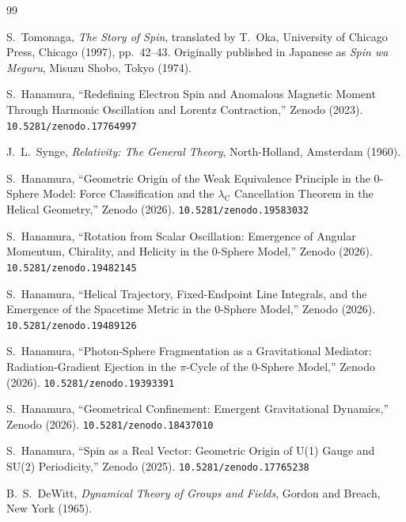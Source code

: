 \documentclass[12pt,letterpaper]{article}
\newcommand{\doilink}[1]{\texttt{#1}}
\newcommand{\lambdaC}{\lambda_{\mathrm{C}}}
\begin{document}
\clearpage
\begin{thebibliography}{99}
\raggedright


S.~Tomonaga, \textit{The Story of Spin},
translated by T.~Oka,
University of Chicago Press, Chicago (1997), pp.~42--43.
Originally published in Japanese as \textit{Spin wa Meguru},
Misuzu Shobo, Tokyo (1974).

S.~Hanamura, ``Redefining Electron Spin and Anomalous Magnetic Moment
Through Harmonic Oscillation and Lorentz Contraction,''
Zenodo (2023). \doilink{10.5281/zenodo.17764997}

J.~L.~Synge, \textit{Relativity: The General Theory},
North-Holland, Amsterdam (1960).

S.~Hanamura, ``Geometric Origin of the Weak Equivalence Principle
in the 0-Sphere Model: Force Classification and the $\lambdaC$ Cancellation Theorem
in the Helical Geometry,''
Zenodo (2026). \doilink{10.5281/zenodo.19583032}

S.~Hanamura, ``Rotation from Scalar Oscillation: Emergence of Angular Momentum,
Chirality, and Helicity in the 0-Sphere Model,'' Zenodo (2026). \doilink{10.5281/zenodo.19482145}

S.~Hanamura, ``Helical Trajectory, Fixed-Endpoint Line Integrals,
and the Emergence of the Spacetime Metric in the 0-Sphere Model,''
Zenodo (2026). \doilink{10.5281/zenodo.19489126}

S.~Hanamura, ``Photon-Sphere Fragmentation as a Gravitational Mediator:
Radiation-Gradient Ejection in the $\pi$-Cycle of the 0-Sphere Model,''
Zenodo (2026). \doilink{10.5281/zenodo.19393391}

S.~Hanamura, ``Geometrical Confinement: Emergent Gravitational Dynamics,''
Zenodo (2026). \doilink{10.5281/zenodo.18437010}

S.~Hanamura, ``Spin as a Real Vector: Geometric Origin of U(1) Gauge
and SU(2) Periodicity,'' Zenodo (2025). \doilink{10.5281/zenodo.17765238}

B.~S.~DeWitt, \textit{Dynamical Theory of Groups and Fields},
Gordon and Breach, New York (1965).


\end{thebibliography}
\end{document}

